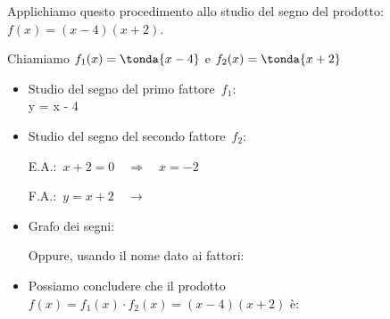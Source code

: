 \begin{esempio}{}{}
Applichiamo questo procedimento allo studio del segno del 
prodotto: \\
\(f(x)=(x-4)(x+2)\).

Chiamiamo \(f_1(x)=\tonda{x-4}\) \quad e \quad \(f_2(x)=\tonda{x+2}\)

\begin{itemize} [noitemsep]
\item Studio del segno del primo fattore~\(f_1\):\\

           {y = x - 4 \quad \rightarrow}
           {}
\item Studio del segno del secondo fattore~\(f_2\):\\
\begin{minipage}{.45\textwidth}
E.A.:~\(x + 2 = 0 \quad \Rightarrow \quad x=-2\)
\end{minipage}
\begin{minipage}{.25\textwidth}
F.A.:~\(y = x + 2 \quad \rightarrow\)
\end{minipage}
\begin{minipage}{.3\textwidth}
%   
\end{minipage}
\item Grafo dei segni:

\segnoprodottoa

Oppure, usando il nome dato ai fattori: 

\segnoprodottoas
\item Possiamo concludere che il prodotto 
\(f(x) = f_1(x) \cdot f_2(x)=(x -4)(x +2)\) è:
\end{itemize}
\end{esempio}

